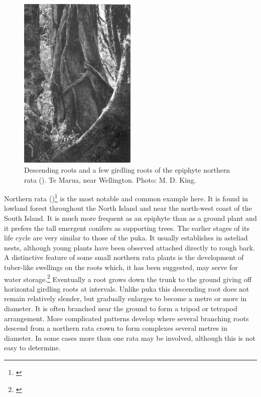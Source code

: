\begin{figure}
	\includegraphics[width=0.5\textwidth]{graphics/figure50rata.jpg}
	\centering
	\caption[Descending roots and a few girdling roots of the epiphyte northern rata]{Descending roots and a few girdling roots of the epiphyte northern rata ().
Te Marua, near Wellington.
	Photo: M. D. King.}%
	\label{fig:50rata}
\end{figure}

Northern rata ()\footnote{\cite{dawson1967growth}} is the most notable and common example here.
It is found in lowland forest throughout the North Island and near the north-west coast of the South Island.
It is much more frequent as an epiphyte than as a ground plant and it prefers the tall emergent conifers as supporting trees.
The earlier stages of its life cycle are very similar to those of the puka.
It usually establishes in asteliad nests, although young plants have been observed attached directly to rough bark.
A distinctive feature of some small northern rata plants is the development of tuber-like swellings on the roots which, it has been suggested, may serve for water storage.\footnote{\cite{beddie1953root}}
Eventually a root grows down the trunk to the ground giving off horizontal girdling roots at intervals.
Unlike puka this descending root does not remain relatively slender, but gradually enlarges to become a metre or more in diameter.
It is often branched near the ground to form a tripod or tetrapod arrangement.
More complicated patterns develop where several branching roots descend from a northern rata crown to form complexes several metres in diameter.
In some cases more than one rata may be involved, although this is not easy to determine.

